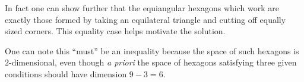 \begin{remark*}
  In fact one can show further that the equiangular hexagons
  which work are exactly those formed by taking an equilateral triangle
  and cutting off equally sized corners.
  This equality case helps motivate the solution.
\end{remark*}
\begin{remark*}
  One can note this ``must'' be an inequality
  because the space of such hexagons is $2$-dimensional,
  even though \emph{a priori} the space of hexagons satisfying
  three given conditions should have dimension $9-3=6$.
\end{remark*}
